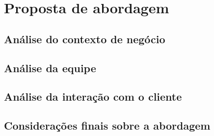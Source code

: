   \section{Proposta de abordagem}
    
    \subsection{Análise do contexto de negócio}
    
    \subsection{Análise da equipe}
    
    \subsection{Análise da interação com o cliente}
    
    \subsection{Considerações finais sobre a abordagem}